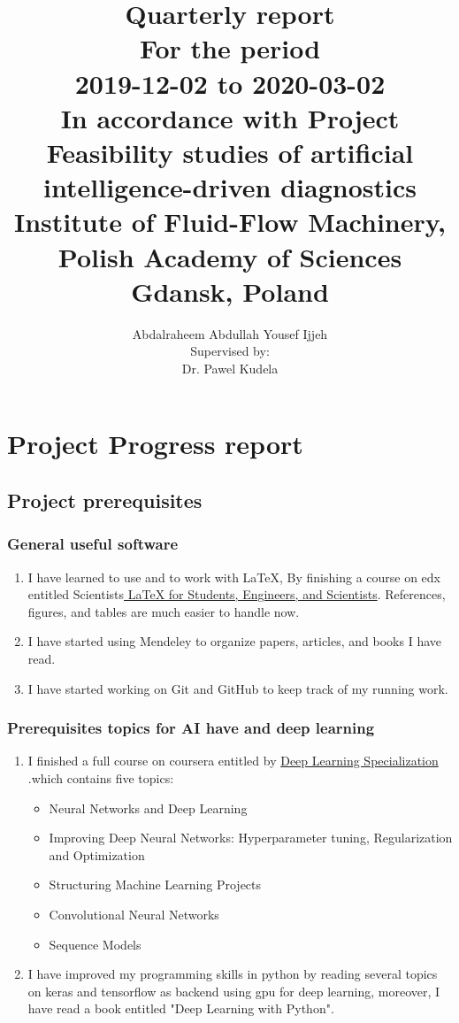\documentclass[11pt,a4paper]{report}
\author{Abdalraheem Abdullah Yousef Ijjeh \\
Supervised by: \\
Dr. Pawel Kudela}
\title{\Huge Quarterly report \\
\huge For the period \\ 2019-12-02 to 2020-03-02
 \\ \Large In accordance with Project\\
Feasibility studies of artificial intelligence-driven diagnostics\\ Institute of Fluid-Flow Machinery, Polish Academy of Sciences
 \\ Gdansk, Poland}
\begin{document}
\maketitle
\tableofcontents
\chapter{Project Progress report}

\section{Project prerequisites}
\subsection{General useful software}
\begin{enumerate}
\item I have learned to use and to work with LaTeX, By finishing a course on edx entitled Scientists\href{https://courses.edx.org/courses/course-v1:IITBombayX+LaTeX101x+3T2019/course/}{ LaTeX for Students, Engineers, and Scientists}. References, figures, and tables are much easier to handle now.  

\item I have started using Mendeley to organize papers, articles, and books I have read.
\item I have started working on Git and GitHub to keep track of my running work.
\end{enumerate}

\subsection{Prerequisites topics for AI have and deep learning}
\begin{enumerate}
\item I finished a full course on coursera entitled by  \href{https://www.coursera.org/specializations/deep-learning#courses}{ Deep Learning Specialization}  
.which contains five topics:
\begin{itemize}
\item Neural Networks and Deep Learning
\item Improving Deep Neural Networks: Hyperparameter tuning, Regularization and Optimization
\item Structuring Machine Learning Projects
\item Convolutional Neural Networks
\item Sequence Models
\end{itemize}
\item I have improved my programming skills in python by reading several topics on keras and tensorflow as backend using gpu for deep learning, moreover, I have read a book entitled "Deep Learning with Python".
\end{enumerate}
\end{document}
